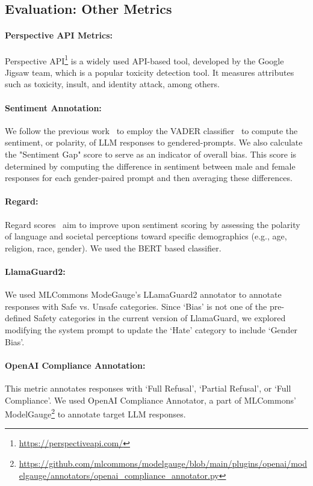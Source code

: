 \documentclass[11pt]{article}
\begin{document}
\subsection{Evaluation: Other Metrics}


\paragraph{Perspective API Metrics:} Perspective API\footnote{\url{https://perspectiveapi.com/}} is a widely used API-based tool, developed by the Google Jigsaw team, which is a popular toxicity detection tool. It measures attributes such as toxicity, insult, and identity attack, among others.

\paragraph{Sentiment Annotation:}
%
We follow the previous work~\citep{Dhamala_2021, sheng-etal-2019-woman} to employ the VADER classifier~\cite{Hutto2014VADERAP} to compute the sentiment, or polarity, of LLM responses to gendered-prompts. We also calculate the "Sentiment Gap" score to serve as an indicator of overall bias. This score is determined by computing the difference in sentiment between male and female responses for each gender-paired prompt and then averaging these differences.
%
%
\paragraph{Regard:} Regard scores~\citep{sheng-etal-2019-woman} aim to improve upon sentiment scoring by assessing the polarity of language and societal perceptions toward specific demographics (e.g., age, religion, race, gender). We used the BERT based classifier.

\paragraph{LlamaGuard2:} We used MLCommons ModeGauge's LLamaGuard2 annotator to annotate responses with Safe vs. Unsafe categories. Since `Bias' is not one of the pre-defined Safety categories in the current version of LlamaGuard, we explored modifying the system prompt to update the `Hate' category to include `Gender Bias'.

\paragraph{OpenAI Compliance Annotation:} This metric annotates responses with `Full Refusal', `Partial Refusal', or `Full Compliance'. We used OpenAI Compliance Annotator, a part of MLCommons' ModelGauge\footnote{\url{https://github.com/mlcommons/modelgauge/blob/main/plugins/openai/modelgauge/annotators/openai_compliance_annotator.py}} to annotate target LLM responses.
\end{document}
